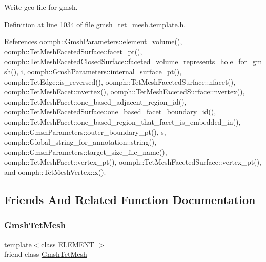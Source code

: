 Write geo file for gmsh. 



Definition at line 1034 of file gmsh\+\_\+tet\+\_\+mesh.\+template.\+h.



References oomph\+::\+Gmsh\+Parameters\+::element\+\_\+volume(), oomph\+::\+Tet\+Mesh\+Faceted\+Surface\+::facet\+\_\+pt(), oomph\+::\+Tet\+Mesh\+Faceted\+Closed\+Surface\+::faceted\+\_\+volume\+\_\+represents\+\_\+hole\+\_\+for\+\_\+gmsh(), i, oomph\+::\+Gmsh\+Parameters\+::internal\+\_\+surface\+\_\+pt(), oomph\+::\+Tet\+Edge\+::is\+\_\+reversed(), oomph\+::\+Tet\+Mesh\+Faceted\+Surface\+::nfacet(), oomph\+::\+Tet\+Mesh\+Facet\+::nvertex(), oomph\+::\+Tet\+Mesh\+Faceted\+Surface\+::nvertex(), oomph\+::\+Tet\+Mesh\+Facet\+::one\+\_\+based\+\_\+adjacent\+\_\+region\+\_\+id(), oomph\+::\+Tet\+Mesh\+Faceted\+Surface\+::one\+\_\+based\+\_\+facet\+\_\+boundary\+\_\+id(), oomph\+::\+Tet\+Mesh\+Facet\+::one\+\_\+based\+\_\+region\+\_\+that\+\_\+facet\+\_\+is\+\_\+embedded\+\_\+in(), oomph\+::\+Gmsh\+Parameters\+::outer\+\_\+boundary\+\_\+pt(), s, oomph\+::\+Global\+\_\+string\+\_\+for\+\_\+annotation\+::string(), oomph\+::\+Gmsh\+Parameters\+::target\+\_\+size\+\_\+file\+\_\+name(), oomph\+::\+Tet\+Mesh\+Facet\+::vertex\+\_\+pt(), oomph\+::\+Tet\+Mesh\+Faceted\+Surface\+::vertex\+\_\+pt(), and oomph\+::\+Tet\+Mesh\+Vertex\+::x().



\subsection{Friends And Related Function Documentation}
\mbox{\label{classoomph_1_1GmshTetScaffoldMesh_a542660fc34eb890a935f0d42a3b4eb8a}} 
\subsubsection{\texorpdfstring{Gmsh\+Tet\+Mesh}{GmshTetMesh}}
{\footnotesize\ttfamily template$<$class E\+L\+E\+M\+E\+NT $>$ \\
friend class \hyperlink{classoomph_1_1GmshTetMesh}{Gmsh\+Tet\+Mesh}\hspace{0.3cm}{\ttfamily [friend]}}




